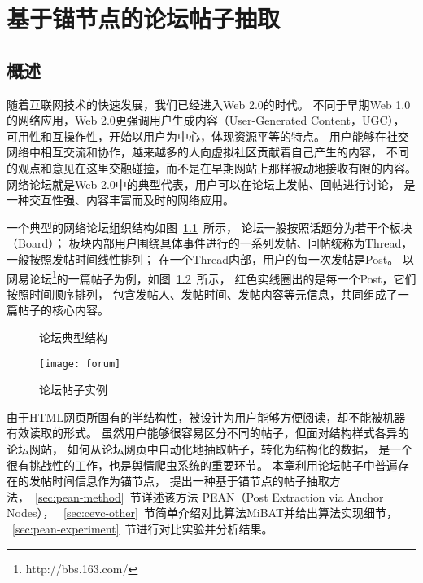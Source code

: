 
\chapter{基于锚节点的论坛帖子抽取}

\section{概述}
随着互联网技术的快速发展，我们已经进入Web 2.0的时代。
不同于早期Web 1.0的网络应用，Web 2.0更强调用户生成内容（User-Generated Content，UGC），
可用性和互操作性，开始以用户为中心，体现资源平等的特点。
用户能够在社交网络中相互交流和协作，越来越多的人向虚拟社区贡献着自己产生的内容，
不同的观点和意见在这里交融碰撞，而不是在早期网站上那样被动地接收有限的内容。
网络论坛就是Web 2.0中的典型代表，用户可以在论坛上发帖、回帖进行讨论，
是一种交互性强、内容丰富而及时的网络应用。

一个典型的网络论坛组织结构如图~\ref{fig:forum-structure}~所示，
论坛一般按照话题分为若干个板块（Board）；
板块内部用户围绕具体事件进行的一系列发帖、回帖统称为Thread，一般按照发帖时间线性排列；
在一个Thread内部，用户的每一次发帖是Post。
以网易论坛\footnote{http://bbs.163.com/}的一篇帖子为例，如图~\ref{fig:forum}~所示，
红色实线圈出的是每一个Post，它们按照时间顺序排列，
包含发帖人、发帖时间、发帖内容等元信息，共同组成了一篇帖子的核心内容。

\begin{figure}[htbp]
\centering
{}
\caption{论坛典型结构}
\label{fig:forum-structure}
\end{figure}

\begin{figure}[htbp]
\centering
\texttt{[image: forum]}
\caption{论坛帖子实例}
\label{fig:forum}
\end{figure}

由于HTML网页所固有的半结构性，被设计为用户能够方便阅读，却不能被机器有效读取的形式。
虽然用户能够很容易区分不同的帖子，但面对结构样式各异的论坛网站，
如何从论坛网页中自动化地抽取帖子，转化为结构化的数据，
是一个很有挑战性的工作，也是舆情爬虫系统的重要环节。
本章利用论坛帖子中普遍存在的发帖时间信息作为锚节点，
提出一种基于锚节点的帖子抽取方法，~\ref{sec:pean-method}~节详述该方法
PEAN（Post Extraction via Anchor Nodes），
~\ref{sec:cevc-other}~节简单介绍对比算法MiBAT并给出算法实现细节，
~\ref{sec:pean-experiment}~节进行对比实验并分析结果。

